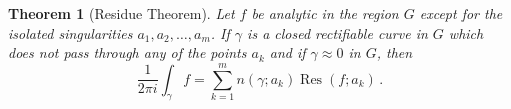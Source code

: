 \documentclass{article}
\newtheorem{theorem}{Theorem}
\DeclareMathOperator{\Res}{Res}
\begin{document}
\ifdefined\HCode
{}
\fi

\begin{theorem}[Residue Theorem]
Let $f$ be analytic in the region $G$ except for the isolated 
singularities $a_1,a_2,\dots,a_m$. If $\gamma$ is a closed 
rectifiable curve in $G$ which does not pass through any of the 
points $a_k$ and if $\gamma\approx 0$ in $G$, then
\[
  \frac{1}{2\pi i}\int_\gamma\! f = \sum_{k=1}^m 
  n(\gamma;a_k)\Res(f;a_k)\,.
\]
\end{theorem}
\end{document}

